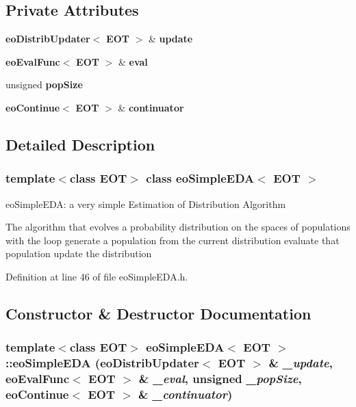 \subsection*{Private Attributes}
\begin{CompactItemize}
\item 
{\bf eo\-Distrib\-Updater}$<$ {\bf EOT} $>$ \& {\bf update}\label{classeo_simple_e_d_a_r0}

\item 
{\bf eo\-Eval\-Func}$<$ {\bf EOT} $>$ \& {\bf eval}\label{classeo_simple_e_d_a_r1}

\item 
unsigned {\bf pop\-Size}\label{classeo_simple_e_d_a_r2}

\item 
{\bf eo\-Continue}$<$ {\bf EOT} $>$ \& {\bf continuator}\label{classeo_simple_e_d_a_r3}

\end{CompactItemize}


\subsection{Detailed Description}
\subsubsection*{template$<$class EOT$>$ class eo\-Simple\-EDA$<$ EOT $>$}

eo\-Simple\-EDA: a very simple Estimation of Distribution Algorithm 

The algorithm that evolves a probability distribution on the spaces of populations with the loop generate a population from the current distribution evaluate that population update the distribution 



Definition at line 46 of file eo\-Simple\-EDA.h.

\subsection{Constructor \& Destructor Documentation}
\subsubsection{\setlength{\rightskip}{0pt plus 5cm}template$<$class EOT$>$ {\bf eo\-Simple\-EDA}$<$ {\bf EOT} $>$::{\bf eo\-Simple\-EDA} ({\bf eo\-Distrib\-Updater}$<$ {\bf EOT} $>$ \& {\em \_\-update}, {\bf eo\-Eval\-Func}$<$ {\bf EOT} $>$ \& {\em \_\-eval}, unsigned {\em \_\-pop\-Size}, {\bf eo\-Continue}$<$ {\bf EOT} $>$ \& {\em \_\-continuator})\hspace{0.3cm}{\tt  [inline]}}\label{classeo_simple_e_d_a_a0}


